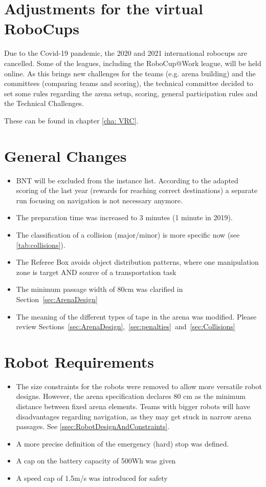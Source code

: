 \section{Adjustments for the virtual RoboCups}

Due to the Covid-19 pandemic, the 2020 and 2021 international robocups are cancelled. 
Some of the leagues, including the RoboCup@Work league, will be held online.
As this brings new challenges for the teams (e.g. arena building) and the committees (comparing teams and scoring),
the technical committee decided to set some rules regarding the arena setup, scoring, general participation rules and the Technical Challenges.

These can be found in chapter \ref{cha: VRC}.  


\section{General Changes}
\begin{itemize}
  \item BNT will be excluded from the instance list. According to the adapted scoring of the last year (rewards for reaching correct destinations) a separate run focusing on navigation is not necessary anymore.
  \item The preparation time was increased to 3 minutes (1 minute in 2019).
  \item The classification of a collision (major/minor) is more specific now (see \ref{tab:collisions}).
  \item The Referee Box avoids object distribution patterns, where one manipulation zone is target AND source of a transportation task
  \item The minimum passage width of 80cm was clarified in Section~\ref{sec:ArenaDesign}
  \item The meaning of the different types of tape in the arena was modified. Please review Sections~\ref{sec:ArenaDesign},~\ref{sec:penalties}~and~\ref{sec:Collisions}
\end{itemize}

\section{Robot Requirements}
\begin{itemize}
  \item The size constraints for the robots were removed to allow more versatile robot designs. 
  		However, the arena specification declares 80 cm as the minimum distance between fixed arena elements.
  		Teams with bigger robots will have disadvantages regarding navigation, as they may get stuck in narrow arena passages. 
  		See \ref{ssec:RobotDesignAndConstraints}.
  \item A more precise definition of the emergency (hard) stop was defined.
  \item A cap on the battery capacity of 500Wh was given
  \item A speed cap of 1.5m/s was introduced for safety
\end{itemize}

